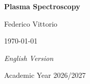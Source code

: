 \documentclass[a4paper, 10 pt]{book}
\begin{document}
\begin{titlepage}
    \centering
    \vspace*{3cm}
    {\Huge\bfseries Plasma Spectroscopy\par}
    
    \vspace{1.5cm}
    {\Large Federico Vittorio\par}
    
    \vspace{0.6cm}
    {\large \today\par}
    
    \vfill
    
   {\normalsize\itshape English Version\par}
    \vspace{0.3cm}
    {\large Academic Year 2026/2027\par}
    \vspace*{1cm}
\end{titlepage}
\tableofcontents










\end{document}
